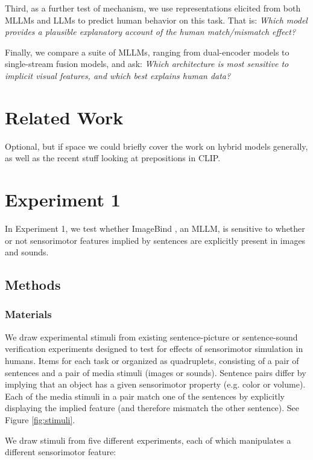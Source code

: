 \documentclass[11pt]{article}
\begin{document}
Third, as a further test of mechanism, we use representations elicited from both MLLMs and LLMs to predict human behavior on this task. That is: \textit{Which model provides a plausible explanatory account of the human match/mismatch effect?}

Finally, we compare a suite of MLLMs, ranging from dual-encoder models to single-stream fusion models, and ask: \textit{Which architecture is most sensitive to implicit visual features, and which best explains human data?}




\section{Related Work}

Optional, but if space we could briefly cover the work on hybrid models generally, as well as the recent stuff looking at prepositions in CLIP.


\section{Experiment 1}

In Experiment 1, we test whether ImageBind \citep{girdhar2023imagebind}, an MLLM, is sensitive to whether or not sensorimotor features implied by sentences are explicitly present in images and sounds. 

\subsection{Methods}

\subsubsection{Materials}

We draw experimental stimuli from existing sentence-picture or sentence-sound verification experiments designed to test for effects of sensorimotor simulation in humans. Items for each task or organized as quadruplets, consisting of a pair of sentences and a pair of media stimuli (images or sounds). Sentence pairs differ by implying that an object has a given sensorimotor property (e.g. color or volume).
Each of the media stimuli in a pair match one of the sentences by explicitly displaying the implied feature (and therefore mismatch the other sentence). See Figure \ref{fig:stimuli}.

We draw stimuli from five different experiments, each of which manipulates a different sensorimotor feature:
\end{document}
